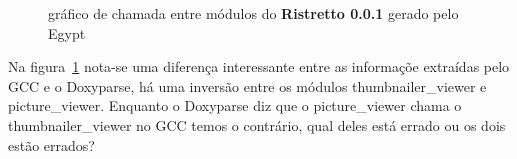 \begin{figure}
\center
{}
\qquad
{}
\caption{gráfico de chamada entre módulos do {\bf Ristretto 0.0.1} gerado pelo Egypt}
\label{ristretto-0.0.1}
\end{figure}

Na figura~\ref{ristretto-0.0.1} nota-se uma diferença interessante entre as
informaçõe extraídas pelo GCC e o Doxyparse, há uma inversão entre os módulos
thumbnailer\_viewer e picture\_viewer. Enquanto o Doxyparse diz que o
picture\_viewer chama o thumbnailer\_viewer no GCC temos o contrário, qual
deles está errado ou os dois estão errados?


